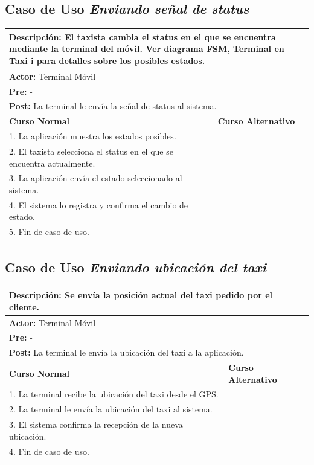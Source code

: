 \documentclass[a4paper]{article}
\begin{document}
\subsection{Caso de Uso \textit{Enviando se\~nal de status}}
\begin{center}
\begin{tabular}{|p{10cm} | p{6cm}|}
\hline
\multicolumn{2}{|p{16cm}|}{\textbf{Descripci\'on:} El taxista cambia el status en el que se encuentra mediante la terminal del m\'ovil. Ver diagrama FSM, Terminal en Taxi i para detalles sobre los posibles estados.} \\
\hline
\multicolumn{2}{|p{15cm}|}{\textbf{Actor:} Terminal M\'ovil } \\
\hline
\multicolumn{2}{|p{15cm}|}{\textbf{Pre:} - } \\
\hline
\multicolumn{2}{|p{15cm}|}{\textbf{Post:} La terminal le env\'ia la se\~nal de status al sistema. }\\
\hline
\textbf{Curso Normal}  & \textbf{Curso Alternativo} \\ \hline
1. La aplicaci\'on muestra los estados posibles.  & \\ \hline
2. El taxista selecciona el status en el que se encuentra actualmente. & \\ \hline
3. La aplicaci\'on env\'ia el estado seleccionado al sistema. & \\ \hline
4. El sistema lo registra y confirma el cambio de estado. & \\ \hline
5. Fin de caso de uso. & \\ \hline
\end{tabular}
\end{center}

\subsection{Caso de Uso \textit{Enviando ubicaci\'on del taxi}}
\begin{center}
\begin{tabular}{|p{10cm} | p{6cm}|}
\hline
\multicolumn{2}{|p{16cm}|}{\textbf{Descripci\'on: } Se env\'ia la posici\'on actual del taxi pedido por el cliente. }  \\
\hline
\multicolumn{2}{|p{15cm}|}{\textbf{Actor:} Terminal M\'ovil } \\
\hline
\multicolumn{2}{|p{15cm}|}{\textbf{Pre:} - } \\
\hline
\multicolumn{2}{|p{15cm}|}{\textbf{Post:} La terminal le env\'ia la ubicaci\'on del taxi a la aplicaci\'on. }\\
\hline
\textbf{Curso Normal}  & \textbf{Curso Alternativo} \\ \hline
1. La terminal recibe la ubicaci\'on del taxi desde el GPS. & \\ \hline
2. La terminal le env\'ia la ubicaci\'on del taxi al sistema. & \\ \hline
3. El sistema confirma la recepci\'on de la nueva ubicaci\'on. & \\ \hline
4. Fin de caso de uso. & \\ \hline
\end{tabular}
\end{center}
\end{document}

